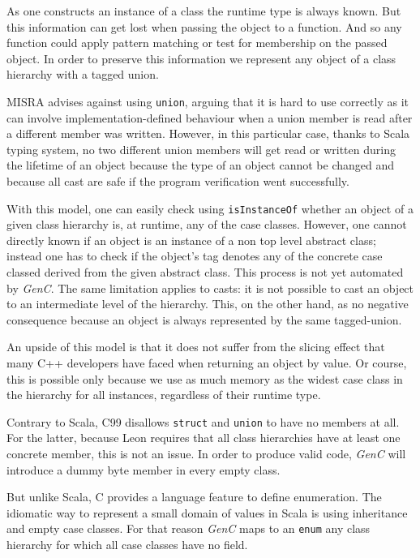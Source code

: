 \documentclass[a4paper,twoside]{article}
\newcommand{\InlineC}[1]{\lstinline[language=C99]|#1|}
\newcommand{\InlineS}[1]{\lstinline[language=Leon]|#1|}
\newcommand{\GenC}{\emph{GenC}\xspace}
\begin{document}
As one constructs an instance of a class the runtime type is always known. But
this information can get lost when passing the object to a function. And so any
function could apply pattern matching or test for membership on the passed
object. In order to preserve this information we represent any object of a class
hierarchy with a tagged union.

MISRA advises against using \InlineC{union}, arguing that it is hard to use
correctly as it can involve implementation-defined behaviour when a union member
is read after a different member was written. However, in this particular case,
thanks to Scala typing system, no two different union members will get read or
written during the lifetime of an object because the type of an object cannot be
changed and because all cast are safe if the program verification went
successfully.

With this model, one can easily check using \InlineS{isInstanceOf} whether an
object of a given class hierarchy is, at runtime, any of the case classes.
However, one cannot directly known if an object is an instance of a non top
level abstract class; instead one has to check if the object's tag denotes any
of the concrete case classed derived from the given abstract class. This process
is not yet automated by \GenC. The same limitation applies to casts: it is not
possible to cast an object to an intermediate level of the hierarchy. This, on
the other hand, as no negative consequence because an object is always
represented by the same tagged-union.

An upside of this model is that it does not suffer from the slicing effect that
many C++ developers have faced when returning an object by value. Or course,
this is possible only because we use as much memory as the widest case class in
the hierarchy for all instances, regardless of their runtime type.

Contrary to Scala, C99 disallows \InlineC{struct} and \InlineC{union} to have no
members at all. For the latter, because Leon requires that all class hierarchies
have at least one concrete member, this is not an issue. In order to produce
valid code, \GenC will introduce a dummy byte member in every empty class.

But unlike Scala, C provides a language feature to define enumeration. The
idiomatic way to represent a small domain of values in Scala is using
inheritance and empty case classes. For that reason \GenC maps to an
\InlineC{enum} any class hierarchy for which all case classes have no field.
\end{document}
